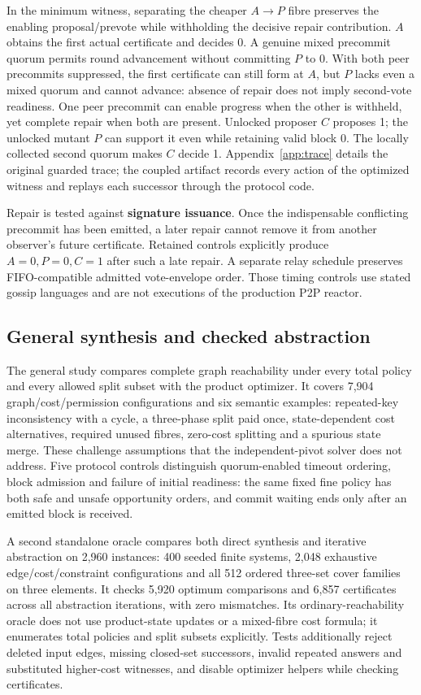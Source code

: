 In the minimum witness, separating the cheaper \(A\to P\) fibre
preserves the enabling proposal/prevote while withholding the decisive
repair contribution. \(A\) obtains the first actual certificate and
decides 0. A genuine mixed precommit quorum permits round advancement
without committing \(P\) to 0. With both peer precommits suppressed, the
first certificate can still form at \(A\), but \(P\) lacks even a mixed
quorum and cannot advance: absence of repair does not imply second-vote
readiness. One peer precommit can enable progress when the other is
withheld, yet complete repair when both are present. Unlocked proposer
\(C\) proposes 1; the unlocked mutant \(P\) can support it even while
retaining valid block 0. The locally collected second quorum makes \(C\)
decide 1. Appendix~\ref{app:trace} details the original guarded trace;
the coupled artifact records every action of the optimized witness and
replays each successor through the protocol code.

Repair is tested against \textbf{signature issuance}. Once the
indispensable conflicting precommit has been emitted, a later repair
cannot remove it from another observer's future certificate. Retained
controls explicitly produce \(A=0,P=0,C=1\) after such a late repair. A
separate relay schedule preserves FIFO-compatible admitted vote-envelope
order. Those timing controls use stated gossip languages and are not
executions of the production P2P reactor.

\subsection{General synthesis and checked
abstraction}\label{general-synthesis-and-checked-abstraction}

The general study compares complete graph reachability under every total
policy and every allowed split subset with the product optimizer. It
covers 7,904 graph/cost/permission configurations and six semantic
examples: repeated-key inconsistency with a cycle, a three-phase split
paid once, state-dependent cost alternatives, required unused fibres,
zero-cost splitting and a spurious state merge. These challenge
assumptions that the independent-pivot solver does not address. Five
protocol controls distinguish quorum-enabled timeout ordering, block
admission and failure of initial readiness: the same fixed fine policy
has both safe and unsafe opportunity orders, and commit waiting ends
only after an emitted block is received.

A second standalone oracle compares both direct synthesis and iterative
abstraction on 2,960 instances: 400 seeded finite systems, 2,048
exhaustive edge/cost/constraint configurations and all 512 ordered
three-set cover families on three elements. It checks 5,920 optimum
comparisons and 6,857 certificates across all abstraction iterations,
with zero mismatches. Its ordinary-reachability oracle does not use
product-state updates or a mixed-fibre cost formula; it enumerates total
policies and split subsets explicitly. Tests additionally reject deleted
input edges, missing closed-set successors, invalid repeated answers and
substituted higher-cost witnesses, and disable optimizer helpers while
checking certificates.

